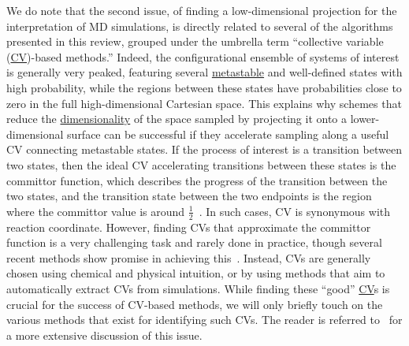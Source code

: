 \documentclass[9pt,review]{livecoms}
\begin{document}
We do note that the second issue, of finding a low-dimensional projection for the interpretation of MD simulations, is directly related to several of the algorithms presented in this review, grouped under the umbrella term ``collective variable (\hyperlink{ref:CV} {CV})-based methods.'' Indeed, the configurational ensemble of systems of interest is generally very peaked, featuring several \hyperlink{ref:metastab} {metastable} and well-defined states with high probability, while the regions between these states have probabilities close to zero in the full high-dimensional Cartesian space. This explains why schemes that reduce the \hyperlink{ref:DimRed} {dimensionality} of the space sampled by projecting it onto a lower-dimensional surface can be successful if they accelerate sampling along a useful CV connecting metastable states.
If the process of interest is a transition between two states, then the ideal CV accelerating transitions between these states is the committor function, which describes the progress of the transition between the two states, and the transition state between the two endpoints is the region where the committor value is around $\frac{1}{2}$~\cite{doi:10.1146/annurev.physchem.53.082301.113146,LiMa_2014,BaronPeters_RC_ARPC_2015,BanushkinaKrivov_2016,Tuckerman2010}. In such cases, CV is synonymous with reaction coordinate. However, finding CVs that approximate the committor function is a very challenging task and rarely done in practice, though several recent methods show promise in achieving this~\cite{LiLinRen_2019,MoriMatubayasi_2020,PalacioRodriguez_Pietrucci_2022,JungHummer_2021,FrassekBolhuis_2021,WuMa_2022}. Instead, CVs are generally chosen using chemical and physical intuition, or by using methods that aim to automatically extract CVs from simulations. While finding these ``good'' \hyperlink{ref:CV} {CV}s is crucial for the success of CV-based methods, we will only briefly touch on the various methods that exist for identifying such CVs. The reader is referred to~\cite{WANG2020139, doi:10.1080/00268976.2020.1737742, doi:10.1021/acs.jctc.0c00355} for a more extensive discussion of this issue.
\end{document}
